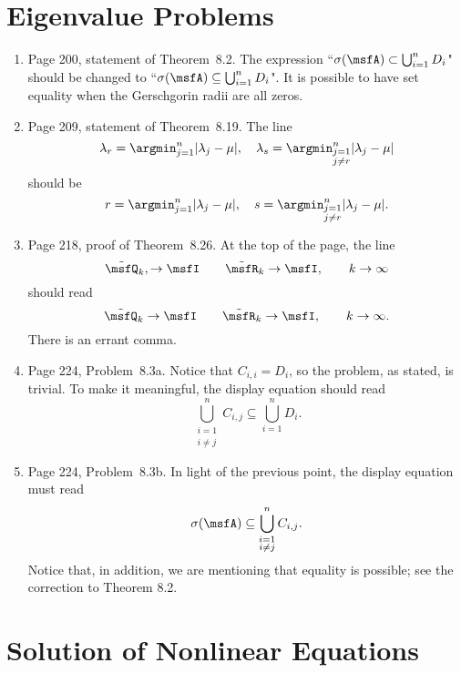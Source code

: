 \documentclass{book}
\begin{document}
	\chapter{Eigenvalue Problems}
	
	\begin{enumerate}
	\item
Page 200, statement of Theorem~8.2. The expression ``$\sigma(\msfA) \subset \bigcup_{i=1}^n D_i$" should be changed to ``$\sigma(\msfA) \subseteq \bigcup_{i=1}^n D_i$". It is possible to have set equality when the Gerschgorin radii are all zeros.

	\item
Page 209, statement of Theorem~8.19. The line
	\[
\lambda_r = \argmin_{j = 1}^n  |\lambda_j - \mu | , \quad \lambda_s = \argmin_{\substack{j = 1 \\ j\ne r}}^n |\lambda_j - \mu |
	\]
should be
	\[
r = \argmin_{j = 1}^n  |\lambda_j - \mu | , \quad s = \argmin_{\substack{j = 1 \\ j\ne r}}^n |\lambda_j - \mu |.
	\]
	
	\item
Page 218, proof of Theorem~8.26. At the top of the page, the line
	\[
\tilde{\msfQ}_{k}, \to \msfI \qquad \tilde{\msfR}_{k}\to \msfI , \qquad k\to\infty
	\]
should read
	\[
\tilde{\msfQ}_{k} \to \msfI \qquad \tilde{\msfR}_{k}\to \msfI , \qquad k\to\infty.	
	\]
There is an errant comma.
	

\item Page 224, Problem~8.3a. Notice that $C_{i,i} = D_i$, so the problem, as stated, is trivial. To make it meaningful, the display equation should read
\[
  \bigcup_{\substack{i=1 \\ i\neq j}}^n C_{i,j} \subseteq \bigcup_{i=1}^n D_i.
\]

\item Page 224, Problem~8.3b. In light of the previous point, the display equation must read
\[
  \sigma(\msfA) \subseteq  \bigcup_{\substack{i=1 \\ i\neq j}}^n C_{i,j}.
\]
Notice that, in addition, we are mentioning that equality is possible; see the correction to Theorem 8.2.


	\end{enumerate}

	
	\setcounter{chapter}{14}
	
	\chapter{Solution of Nonlinear Equations}
	
\end{document}
